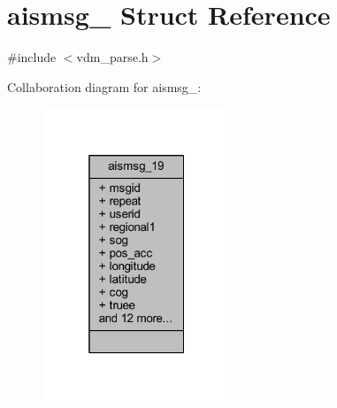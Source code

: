 \hypertarget{structaismsg__19}{}\section{aismsg\+\_ Struct Reference}
\label{structaismsg__19}


{\ttfamily \#include $<$vdm\+\_\+parse.\+h$>$}



Collaboration diagram for aismsg\+\_\+:
\nopagebreak
\begin{figure}[H]
\begin{center}
\leavevmode
\includegraphics[width=160pt]{structaismsg__19__coll__graph}
\end{center}
\end{figure}
